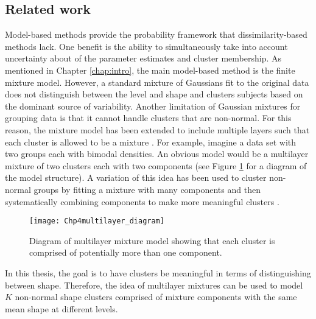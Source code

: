 \subsection{Related work}
Model-based methods provide the probability framework that dissimilarity-based methods lack. One benefit is the ability to simultaneously take into account uncertainty about of the parameter estimates and cluster membership. As mentioned in Chapter \ref{chap:intro}, the main model-based method is the finite mixture model. However, a standard mixture of Gaussians fit to the original data does not distinguish between the level and shape and clusters subjects based on the dominant source of variability. Another limitation of Gaussian mixtures for grouping data is that it cannot handle clusters that are non-normal. For this reason, the mixture model has been extended to include multiple layers such that each cluster is allowed to be a mixture \cite{li2005}.  For example, imagine a data set with two groups each with bimodal densities. An obvious model would be a multilayer mixture of two clusters each with two components (see Figure \ref{fig:dia} for a diagram of the model structure). A variation of this idea has been used to cluster non-normal groups by fitting a mixture with many components and then systematically combining components to make more meaningful clusters \cite{hennig2010}. 
\begin{figure}[h]
\centering
\texttt{[image: Chp4multilayer\_diagram]}
\caption{Diagram of multilayer mixture model showing that each cluster is comprised of potentially more than one component.}
\label{fig:dia}
\end{figure}

In this thesis, the goal is to have clusters be meaningful in terms of distinguishing between shape. Therefore, the idea of multilayer mixtures can be used to model $K$ non-normal shape clusters comprised of mixture components with the same mean shape at different levels.


